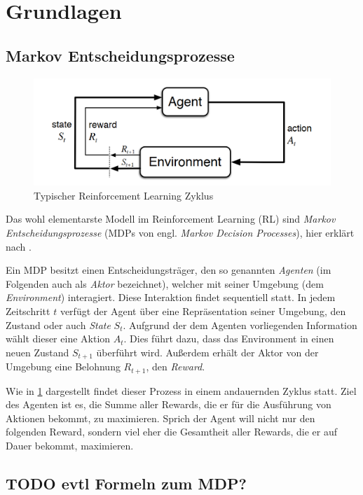 \section{Grundlagen}
\label{sec:basics}

\subsection{Markov Entscheidungsprozesse}
\label{sec:reinforcement}
\begin{figure}[h]
\includegraphics[width=\textwidth, keepaspectratio=true]{images/mdp.png}
\caption{Typischer Reinforcement Learning Zyklus} \label{img:rl_cycle}
\end{figure}
Das wohl elementarste Modell im Reinforcement Learning (RL) sind \textit{Markov Entscheidungsprozesse} (MDPs von engl. \textit{Markov Decision Processes}), hier erklärt nach \cite{deeplizard_markov_decision_processes}.

Ein MDP besitzt einen Entscheidungsträger, den so genannten \textit{Agenten} (im Folgenden auch als \textit{Aktor} bezeichnet), welcher mit seiner Umgebung (dem \textit{Environment}) interagiert. Diese Interaktion findet sequentiell statt. In jedem Zeitschritt $ t $ verfügt der Agent über eine Repräsentation seiner Umgebung, den Zustand oder auch \textit{State} $ S_t $. Aufgrund der dem Agenten vorliegenden Information wählt dieser eine Aktion $ A_t $. Dies führt dazu, dass das Environment in einen neuen Zustand $ S_{t+1} $ überführt wird. Außerdem erhält der Aktor von der Umgebung eine Belohnung $ R_{t+1} $, den \textit{Reward}.

Wie in \ref{img:rl_cycle} dargestellt findet dieser Prozess in einem andauernden Zyklus statt. Ziel des Agenten ist es, die Summe aller Rewards, die er für die Ausführung von Aktionen bekommt, zu maximieren. Sprich der Agent will nicht nur den folgenden Reward, sondern viel eher die Gesamtheit aller Rewards, die er auf Dauer bekommt, maximieren.

\subsection{TODO evtl Formeln zum MDP?}
\label{sec:markov}
